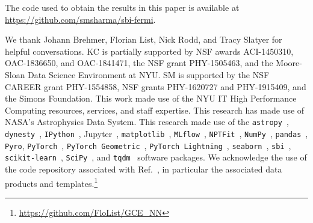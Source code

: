 \documentclass[prd,aps,10pt,nofootinbib,twocolumn,superscriptaddress,preprintnumbers,balancelastpage,longbibliography]{revtex4-1}
\begin{document}
The code used to obtain the results in this paper is available at \url{https://github.com/smsharma/sbi-fermi}.

\vspace{.3cm}

\begin{acknowledgments}

We thank Johann Brehmer, Florian List, Nick Rodd, and Tracy Slatyer for helpful conversations.  
KC is partially supported by NSF awards ACI-1450310, OAC-1836650, and OAC-1841471, the NSF grant PHY-1505463, and the Moore-Sloan Data Science Environment at NYU. 
SM is supported by the NSF CAREER grant PHY-1554858, NSF grants PHY-1620727 and PHY-1915409, and the Simons Foundation. 
This work made use of the NYU IT High Performance Computing resources, services, and staff expertise. 
This research has made use of NASA's Astrophysics Data System. 
This research made use of the \texttt{astropy}~\cite{Price-Whelan:2018hus,Robitaille:2013mpa}, \texttt{dynesty}~\cite{Speagle_2020}, \texttt{IPython}~\cite{PER-GRA:2007}, Jupyter~\cite{Kluyver2016JupyterN}, \texttt{matplotlib}~\cite{Hunter:2007}, \texttt{MLflow}~\cite{chen2020developments}, \texttt{NPTFit}~\cite{Mishra-Sharma:2016gis}, \texttt{NumPy}~\cite{harris2020array}, \texttt{pandas}~\cite{pandas:2010}, \texttt{Pyro}, \texttt{PyTorch}~\cite{NEURIPS2019_9015}, \texttt{PyTorch Geometric}~\cite{Fey/Lenssen/2019}, \texttt{PyTorch Lightning}~\cite{william_falcon_2020_3828935}, \texttt{seaborn}~\cite{seaborn}, \texttt{sbi}~\cite{tejero-cantero2020sbi}, \texttt{scikit-learn}~\cite{scikit-learn}, \texttt{SciPy}~\cite{2020SciPy-NMeth}, and \texttt{tqdm}~\cite{da2019tqdm}  software packages. We acknowledge the use of the code repository associated with Ref.~\cite{List:2020mzd}, in particular the associated data products and templates.\footnote{\url{https://github.com/FloList/GCE_NN}}
\end{acknowledgments}





\end{document}

